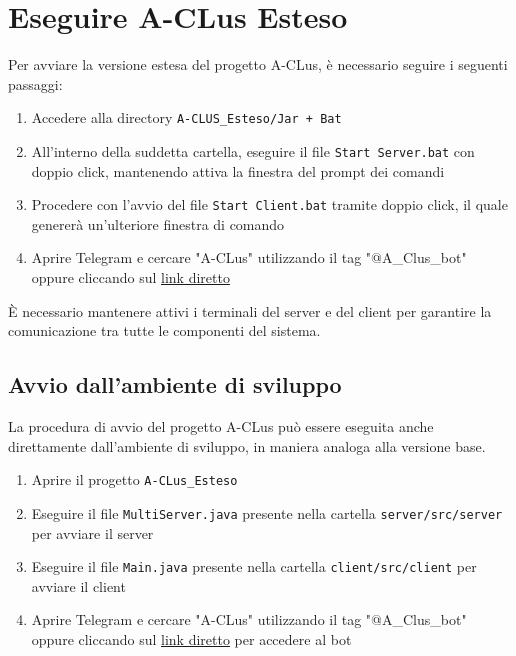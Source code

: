 
\section{Eseguire A-CLus Esteso}


Per avviare la versione estesa del progetto A-CLus, è necessario seguire i seguenti passaggi:
\begin{enumerate}
    \item Accedere alla directory \texttt{A-CLUS\_Esteso/Jar + Bat}
    \item All'interno della suddetta cartella, eseguire il file \texttt{Start Server.bat} con doppio click, mantenendo attiva la finestra del prompt dei comandi
    \item Procedere con l'avvio del file \texttt{Start Client.bat} tramite doppio click, il quale genererà un'ulteriore finestra di comando
    \item Aprire Telegram e cercare "A-CLus" utilizzando il tag "@A\_Clus\_bot" oppure cliccando sul \href{https://shorturl.at/r07hj}{link diretto}
\end{enumerate}

\begin{tcolorbox}[colback=white, colframe=gray, title=Avvertenza]
    È necessario mantenere attivi i terminali del server e del client per garantire la comunicazione tra tutte le componenti del sistema.
\end{tcolorbox}

\subsection{Avvio dall'ambiente di sviluppo}

La procedura di avvio del progetto A-CLus può essere eseguita anche direttamente dall'ambiente di sviluppo, in maniera analoga alla versione base. 

\begin{enumerate}
    \item Aprire il progetto \texttt{A-CLus\_Esteso}
    \item Eseguire il file \texttt{MultiServer.java} presente nella cartella \texttt{server/src/server} per avviare il server
    \item Eseguire il file \texttt{Main.java} presente nella cartella \texttt{client/src/client} per avviare il client
    \item Aprire Telegram e cercare "A-CLus" utilizzando il tag "@A\_Clus\_bot" oppure cliccando sul \href{https://shorturl.at/r07hj}{link diretto} per accedere al bot 
\end{enumerate}

